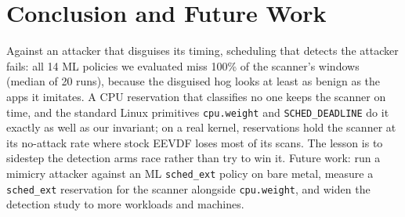 \documentclass[conference]{IEEEtran}
\begin{document}
\section{Conclusion and Future Work}
Against an attacker that disguises its timing, scheduling that detects the
attacker fails: all 14 ML policies we evaluated miss 100\% of the scanner's
windows (median of 20 runs), because the disguised hog looks at least as benign
as the apps it imitates. A
CPU reservation that classifies no one keeps the scanner on time, and the
standard Linux primitives \texttt{cpu.weight} and \texttt{SCHED\_DEADLINE} do
it exactly as well as our invariant; on a real kernel, reservations hold the
scanner at its no-attack rate where stock EEVDF loses most of its scans. The
lesson is to sidestep the detection arms race rather than try to win it. Future
work: run a mimicry attacker against an ML \texttt{sched\_ext} policy on bare
metal, measure a \texttt{sched\_ext} reservation for the scanner alongside
\texttt{cpu.weight}, and widen the detection study to more workloads and
machines.
\end{document}
